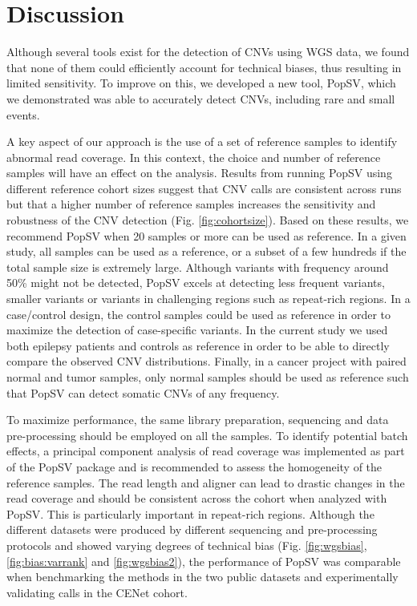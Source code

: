 \section{Discussion}

Although several tools exist for the detection of CNVs using WGS data, we found that none of them could efficiently account for technical biases, thus resulting in limited sensitivity.
To improve on this, we developed a new tool, {\sf PopSV}, which we demonstrated was able to accurately detect CNVs, including rare and small events.

A key aspect of our approach is the use of a set of reference samples to identify abnormal read coverage.
In this context, the choice and number of reference samples will have an effect on the analysis.
Results from running {\sf PopSV} using different reference cohort sizes suggest that CNV calls are consistent across runs but that a higher number of reference samples increases the sensitivity and robustness of the CNV detection (Fig. \ref{fig:cohortsize}).
Based on these results, we recommend {\sf PopSV} when 20 samples or more can be used as reference.
In a given study, all samples can be used as a reference, or a subset of a few hundreds if the total sample size is extremely large.
Although variants with frequency around 50\% might not be detected, {\sf PopSV} excels at detecting less frequent variants, smaller variants or variants in challenging regions such as repeat-rich regions.
In a case/control design, the control samples could be used as reference in order to maximize the detection of case-specific variants.
In the current study we used both epilepsy patients and controls as reference in order to be able to directly compare the observed CNV distributions.
Finally, in a cancer project with paired normal and tumor samples, only normal samples should be used as reference such that {\sf PopSV} can detect somatic CNVs of any frequency.

To maximize performance, the same library preparation, sequencing and data pre-processing should be employed on all the samples.
To identify potential batch effects, a principal component analysis of read coverage was implemented as part of the {\sf PopSV} package and is recommended to assess the homogeneity of the reference samples.
The read length and aligner can lead to drastic changes in the read coverage and should be consistent across the cohort when analyzed with {\sf PopSV}.
This is particularly important in repeat-rich regions.
Although the different datasets were produced by different sequencing and pre-processing protocols and showed varying degrees of technical bias (Fig. \ref{fig:wgsbias}, \ref{fig:bias:varrank} and \ref{fig:wgsbias2}), the performance of {\sf PopSV} was comparable when benchmarking the methods in the two public datasets and experimentally validating calls in the CENet cohort.

